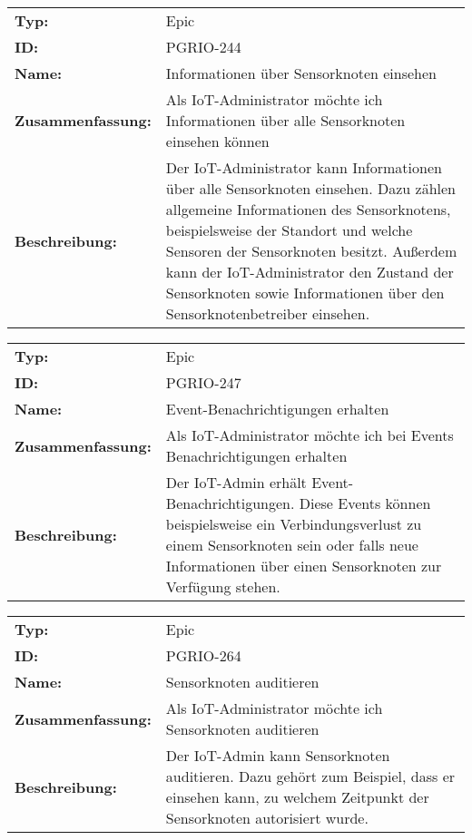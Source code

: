 		\begin{flushleft} 
\begin{tabular}{@{}lp{100mm}} 
\textbf{Typ:} & Epic \\ 
\textbf{ID:} & PGRIO-244 \\ 
\textbf{Name:} & Informationen über Sensorknoten einsehen \\ 
\textbf{Zusammenfassung:} & Als IoT-Administrator möchte ich Informationen über alle Sensorknoten einsehen können \\ 
\textbf{Beschreibung:} & Der IoT-Administrator kann Informationen über alle Sensorknoten einsehen. Dazu zählen allgemeine Informationen des Sensorknotens, beispielsweise der Standort und welche Sensoren der Sensorknoten besitzt. Außerdem kann der IoT-Administrator den Zustand der Sensorknoten sowie Informationen über den Sensorknotenbetreiber einsehen. \\ 
\end{tabular} 
\end{flushleft} 

		\begin{flushleft} 
\begin{tabular}{@{}lp{100mm}} 
\textbf{Typ:} & Epic \\ 
\textbf{ID:} & PGRIO-247 \\ 
\textbf{Name:} & Event-Benachrichtigungen erhalten \\ 
\textbf{Zusammenfassung:} & Als IoT-Administrator möchte ich bei Events Benachrichtigungen erhalten \\ 
\textbf{Beschreibung:} & Der IoT-Admin erhält Event-Benachrichtigungen. Diese Events können beispielsweise ein Verbindungsverlust zu einem Sensorknoten sein oder falls neue Informationen über einen Sensorknoten zur Verfügung stehen.  \\ 
\end{tabular} 
\end{flushleft} 

		\begin{flushleft} 
\begin{tabular}{@{}lp{100mm}} 
\textbf{Typ:} & Epic \\ 
\textbf{ID:} & PGRIO-264 \\ 
\textbf{Name:} & Sensorknoten auditieren \\ 
\textbf{Zusammenfassung:} & Als IoT-Administrator möchte ich Sensorknoten auditieren \\ 
\textbf{Beschreibung:} & Der IoT-Admin kann Sensorknoten auditieren. Dazu gehört zum Beispiel, dass er einsehen kann, zu welchem Zeitpunkt der Sensorknoten autorisiert wurde. \\ 
\end{tabular} 
\end{flushleft} 

